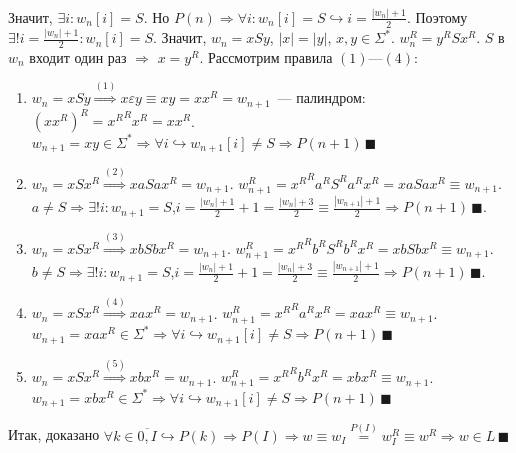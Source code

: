 \documentclass[a4paper]{article}
\begin{document}
\begin{enumerate}
\begin{enumerate}
\begin{enumerate}[1.]
\\[1pt]
Значит, $\exists i\colon w_n[i]=S$. Но $P(n)\Rightarrow \forall i\colon w_n[i]=S\hookrightarrow i=\frac{|w_n|+1}{2}$. Поэтому $\exists!i=\frac{|w_n|+1}{2}\colon w_n[i]=S$. Значит, $w_n=xSy$, $|x|=|y|$, $x,y\in\Sigma^*$. $w_n^R=y^RSx^R$. $S$ в $w_n$ входит один раз $\Rightarrow$ $x=y^R$.\newline
Рассмотрим правила $(1)$---$(4)$:\begin{enumerate}[(1).]
\item $w_n=xSy\overset{(1)}{\Longrightarrow} x\varepsilon y\equiv xy=xx^R=w_{n+1}$~--- палиндром: $(xx^R)^R={x^R}^Rx^R=xx^R$. $w_{n+1}=xy\in\Sigma^*\Rightarrow\forall i\hookrightarrow w_{n+1}[i]\neq S\Rightarrow P(n+1)\,\blacksquare$
\item $w_n=xSx^R\overset{(2)}{\Longrightarrow}xaSax^R=w_{n+1}$. $w_{n+1}^R={x^R}^Ra^RS^Ra^Rx^R=xaSax^R\equiv w_{n+1}$. $a\neq S\Rightarrow \exists!i\colon w_{n+1}=S$,\newline$i=\frac{|w_n|+1}{2}+1=\frac{|w_n|+3}{2}\equiv\frac{|w_{n+1}|+1}{2}\Rightarrow P(n+1)\,\blacksquare$.
\item $w_n=xSx^R\overset{(3)}{\Longrightarrow}xbSbx^R=w_{n+1}$. $w_{n+1}^R={x^R}^Rb^RS^Rb^Rx^R=xbSbx^R\equiv w_{n+1}$. $b\neq S\Rightarrow \exists!i\colon w_{n+1}=S$,\newline$i=\frac{|w_n|+1}{2}+1=\frac{|w_n|+3}{2}\equiv\frac{|w_{n+1}|+1}{2}\Rightarrow P(n+1)\,\blacksquare$.
\item $w_n=xSx^R\overset{(4)}{\Longrightarrow}xax^R=w_{n+1}$. $w_{n+1}^R={x^R}^Ra^Rx^R=xax^R\equiv w_{n+1}$. $w_{n+1}=xax^R\in\Sigma^*\Rightarrow \forall i\hookrightarrow w_{n+1}[i]\neq S\Rightarrow P(n+1)\,\blacksquare$
\item $w_n=xSx^R\overset{(5)}{\Longrightarrow}xbx^R=w_{n+1}$. $w_{n+1}^R={x^R}^Rb^Rx^R=xbx^R\equiv w_{n+1}$. $w_{n+1}=xbx^R\in\Sigma^*\Rightarrow \forall i\hookrightarrow w_{n+1}[i]\neq S\Rightarrow P(n+1)\,\blacksquare$
\end{enumerate}
Итак, доказано $\forall k\in\overline{0,I}\hookrightarrow P(k)\Rightarrow P(I)\Rightarrow w\equiv w_I\overset{P(I)}{=}w_I^R\equiv w^R\Rightarrow w\in L\,\blacksquare$ 

\end{enumerate}
\end{enumerate}
\end{enumerate}
\end{document}
